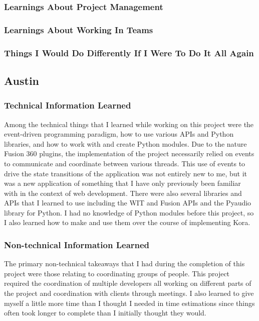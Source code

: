 \documentclass[onecolumn, draftclsnofoot,10pt, compsoc]{IEEEtran}
\begin{document}
	
	
	
	\subsubsection{Learnings About Project Management}




	\subsubsection{Learnings About Working In Teams}




	\subsubsection{Things I Would Do Differently If I Were To Do It All Again}






\subsection{Austin}
	\subsubsection{Technical Information Learned}
		Among the technical things that I learned while working on this project were the event-driven programming paradigm, how to use various APIs and Python libraries, and how to work with and create Python modules.
		Due to the nature Fusion 360 plugins, the implementation of the project necessarily relied on events to communicate and coordinate between various threads.
		This use of events to drive the state transitions of the application was not entirely new to me, but it was a new application of something that I have only previously been familiar with in the context of web development.
		There were also several libraries and APIs that I learned to use including the WIT and Fusion APIs and the Pyaudio library for Python.
		I had no knowledge of Python modules before this project, so I also learned how to make and use them over the course of implementing Kora.

	\subsubsection{Non-technical Information Learned}
		The primary non-technical takeaways that I had during the completion of this project were those relating to coordinating groups of people.
		This project required the coordination of multiple developers all working on different parts of the project and coordination with clients through meetings.
		I also learned to give myself a little more time than I thought I needed in time estimations since things often took longer to complete than I initially thought they would.
\end{document}
